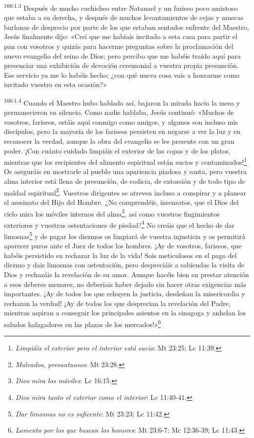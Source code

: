 \par 
\textsuperscript{166:1.3} Después de mucho cuchicheo entre Natanael y un fariseo poco amistoso que estaba a su derecha, y después de muchos levantamientos de cejas y muecas burlonas de desprecio por parte de los que estaban sentados enfrente del Maestro, Jesús finalmente dijo: «Creí que me habíais invitado a esta casa para partir el pan con vosotros y quizás para hacerme preguntas sobre la proclamación del nuevo evangelio del reino de Dios; pero percibo que me habéis traído aquí para presenciar una exhibición de devoción ceremonial a vuestra propia presunción. Ese servicio ya me lo habéis hecho; ¿con qué nueva cosa vais a honrarme como invitado vuestro en esta ocasión?»

\par 
\textsuperscript{166:1.4} Cuando el Maestro hubo hablado así, bajaron la mirada hacia la mesa y permanecieron en silencio. Como nadie hablaba, Jesús continuó: «Muchos de vosotros, fariseos, estáis aquí conmigo como amigos, y algunos son incluso mis discípulos, pero la mayoría de los fariseos persisten en negarse a ver la luz y en reconocer la verdad, aunque la obra del evangelio se les presente con un gran poder. ¡Con cuánto cuidado limpiáis el exterior de las copas y de los platos, mientras que los recipientes del alimento espiritual están sucios y contaminados!\footnote{\textit{Limpiáis el exterior pero el interior está sucio}: Mt 23:25; Lc 11:39.} Os aseguráis en mostrarle al pueblo una apariencia piadosa y santa, pero vuestra alma interior está llena de presunción, de codicia, de extorsión y de todo tipo de maldad espiritual\footnote{\textit{Malvados, presuntuosos}: Mt 23:28.}. Vuestros dirigentes se atreven incluso a conspirar y a planear el asesinato del Hijo del Hombre. ¿No comprendéis, insensatos, que el Dios del cielo mira los móviles internos del alma\footnote{\textit{Dios mira los móviles}: Lc 16:15.}, así como vuestros fingimientos exteriores y vuestras ostentaciones de piedad?\footnote{\textit{Dios mira tanto el exterior como el interior}: Lc 11:40-41.} No creáis que el hecho de dar limosnas\footnote{\textit{Dar limosnas no es suficente}: Mt 23:23; Lc 11:42.} y de pagar los diezmos os limpiará de vuestra injusticia y os permitirá aparecer puros ante el Juez de todos los hombres. ¡Ay de vosotros, fariseos, que habéis persistido en rechazar la luz de la vida! Sois meticulosos en el pago del diezmo y dais limosnas con ostentación, pero despreciáis a sabiendas la visita de Dios y rechazáis la revelación de su amor. Aunque hacéis bien en prestar atención a esos deberes menores, no deberíais haber dejado sin hacer otras exigencias más importantes. ¡Ay de todos los que rehuyen la justicia, desdeñan la misericordia y rechazan la verdad! ¡Ay de todos los que desprecian la revelación del Padre, mientras aspiran a conseguir los principales asientos en la sinagoga y anhelan los saludos halagadores en las plazas de los mercados!»\footnote{\textit{Lamento por los que buscan los honores}: Mt 23:6-7; Mc 12:36-39; Lc 11:43.}


